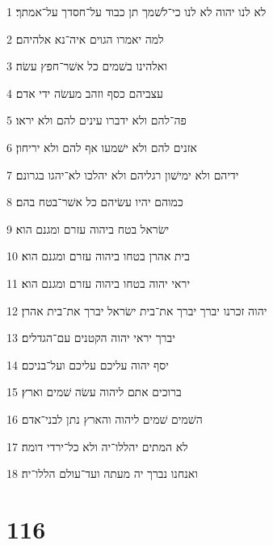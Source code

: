 \par 1 לא לנו יהוה לא לנו כי־לשׁמך תן כבוד על־חסדך על־אמתך׃
\par 2 למה יאמרו הגוים איה־נא אלהיהם׃
\par 3 ואלהינו בשׁמים כל אשׁר־חפץ עשׂה׃
\par 4 עצביהם כסף וזהב מעשׂה ידי אדם׃
\par 5 פה־להם ולא ידברו עינים להם ולא יראו׃
\par 6 אזנים להם ולא ישׁמעו אף להם ולא יריחון׃
\par 7 ידיהם ולא ימישׁון רגליהם ולא יהלכו לא־יהגו בגרונם׃
\par 8 כמוהם יהיו עשׂיהם כל אשׁר־בטח בהם׃
\par 9 ישׂראל בטח ביהוה עזרם ומגנם הוא׃
\par 10 בית אהרן בטחו ביהוה עזרם ומגנם הוא׃
\par 11 יראי יהוה בטחו ביהוה עזרם ומגנם הוא׃
\par 12 יהוה זכרנו יברך יברך את־בית ישׂראל יברך את־בית אהרן׃
\par 13 יברך יראי יהוה הקטנים עם־הגדלים׃
\par 14 יסף יהוה עליכם עליכם ועל־בניכם׃
\par 15 ברוכים אתם ליהוה עשׂה שׁמים וארץ׃
\par 16 השׁמים שׁמים ליהוה והארץ נתן לבני־אדם׃
\par 17 לא המתים יהללו־יה ולא כל־ירדי דומה׃
\par 18 ואנחנו נברך יה מעתה ועד־עולם הללו־יה׃

\chapter{116}

